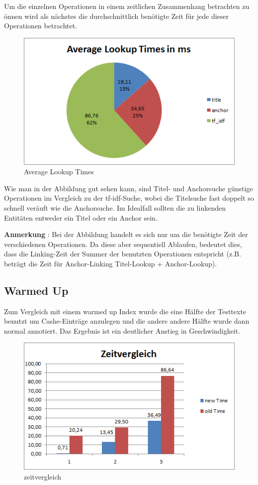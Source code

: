 \documentclass[11pt, a4paper, oneside]{Thesis} %
\begin{document}
Um die einzelnen Operationen in einem zeitlichen Zusammenhang betrachten zu \"onnen wird als n\"achstes die durchschnittlich ben\"otigte Zeit f\"ur jede dieser Operationen betrachtet. 
\begin{figure}[ht!]
\centering
\includegraphics[scale=1]{./lookupTime.png}
\caption[Average Lookup Times]{Average Lookup Times}
\end{figure}

Wie man in der Abbildung gut sehen kann, sind Titel- und Anchorsuche g\"unstige Operationen im Vergleich zu der tf-idf-Suche, wobei die Titelsuche fast doppelt so schnell ver\"auft wie die Anchorsuche. Im Idealfall sollten die zu linkenden Entit\"aten entweder ein Titel oder ein Anchor sein.

\textbf{Anmerkung} : Bei der Abbildung handelt es sich nur um die ben\"otigte Zeit der verschiedenen Operationen. Da diese aber sequentiell Ablaufen, bedeutet dies, dass die Linking-Zeit der Summer der benutzten Operationen entspricht (z.B. betr\"agt die Zeit f\"ur Anchor-Linking Titel-Lookup + Anchor-Lookup).
\subsection{Warmed Up}
Zum Vergleich mit einem \grqq warmed up Index \grqq{} wurde die eine H\"alfte der Testtexte benutzt um Cashe-Eintr\"age anzulegen und die andere andere H\"alfte wurde dann normal annotiert. Das Ergebnis ist ein deutlicher Anstieg in Geschwindigkeit.
\begin{figure}[ht!]
\centering
\includegraphics[scale=1]{./zeitvergleich.png}
\caption[zeitvergleich]{zeitvergleich}
\end{figure}
\end{document}
